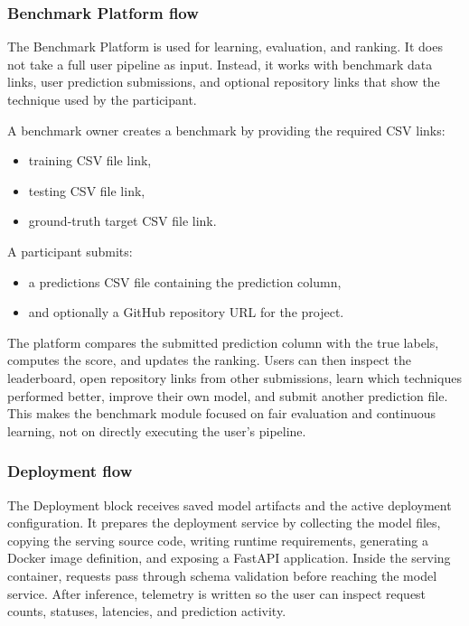 \documentclass[12pt,a4paper]{report}
\begin{document}
\subsubsection*{Benchmark Platform flow}

The Benchmark Platform is used for learning, evaluation, and ranking. It does
not take a full user pipeline as input. Instead, it works with benchmark data
links, user prediction submissions, and optional repository links that show the
technique used by the participant.

A benchmark owner creates a benchmark by providing the required CSV links:

\begin{itemize}
  \item training CSV file link,
  \item testing CSV file link,
  \item ground-truth target CSV file link.
\end{itemize}

A participant submits:

\begin{itemize}
  \item a predictions CSV file containing the prediction column,
  \item and optionally a GitHub repository URL for the project.
\end{itemize}

The platform compares the submitted prediction column with the true labels,
computes the score, and updates the ranking. Users can then inspect the
leaderboard, open repository links from other submissions, learn which
techniques performed better, improve their own model, and submit another
prediction file. This makes the benchmark module focused on fair evaluation and
continuous learning, not on directly executing the user's pipeline.

\subsubsection*{Deployment flow}

The Deployment block receives saved model artifacts and the active deployment
configuration. It prepares the deployment service by collecting the model files,
copying the serving source code, writing runtime requirements, generating a
Docker image definition, and exposing a FastAPI application. Inside the serving
container, requests pass through schema validation before reaching the model
service. After inference, telemetry is written so the user can inspect request
counts, statuses, latencies, and prediction activity.
\end{document}
